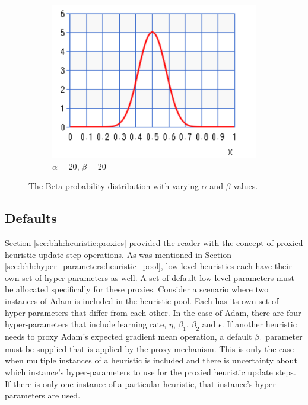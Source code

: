 \begin{figure}[htb]
      \par\bigskip
      \begin{subfigure}{0.49\textwidth}
            \centering
            \centering
            \includegraphics[width=\textwidth]{images/beta_20_20.pdf}
            \caption{$\alpha=20$, $\beta=20$}
            \label{sec:bhh:hyper_parameters:normalisation_beta_20_20}
      \end{subfigure}
      \par\bigskip
      \caption{The Beta probability distribution with varying $\alpha$ and $\beta$ values.}
      \label{sec:bhh:hyper_parameters:discounted_rewards:normalisation}
\end{figure}

\subsection{Defaults}
\label{sec:bhh:hyper_parameters:defaults}

Section \ref{sec:bhh:heuristic:proxies} provided the reader with the concept of proxied heuristic update step operations. As was mentioned in Section \ref{sec:bhh:hyper_parameters:heuristic_pool}, low-level heuristics each have their own set of hyper-parameters as well. A set of default low-level parameters must be allocated specifically for these proxies. Consider a scenario where two instances of \acs{Adam} is included in the heuristic pool. Each has its own set of hyper-parameters that differ from each other. In the case of \acs{Adam}, there are four hyper-parameters that include learning rate, $\eta$, $\beta_{1}$, $\beta_{2}$ and $\epsilon$. If another heuristic needs to proxy \acs{Adam}'s expected gradient mean operation, a default $\beta_{1}$ parameter must be supplied that is applied by the proxy mechanism. This is only the case when multiple instances of a heuristic is included and there is uncertainty about which instance's hyper-parameters to use for the proxied heuristic update steps. If there is only one instance of a particular heuristic, that instance's hyper-parameters are used.

